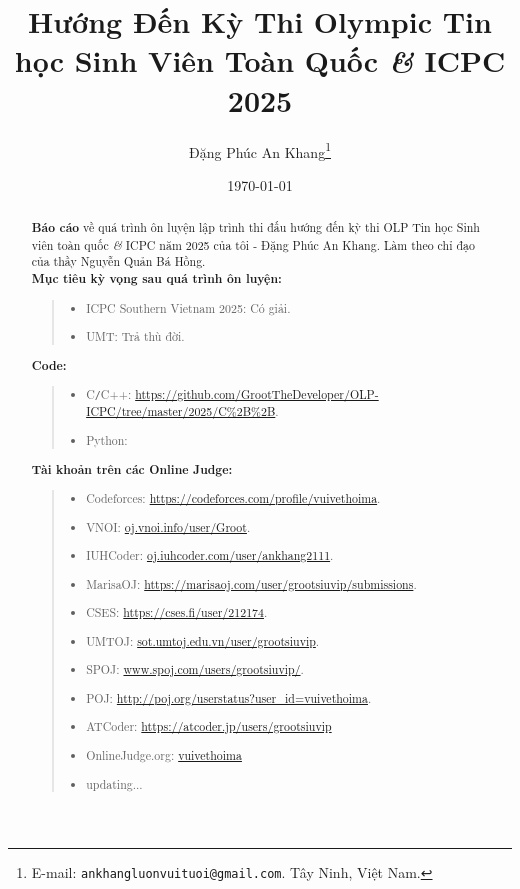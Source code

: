 \documentclass{article}
\title{Hướng Đến Kỳ Thi Olympic Tin học Sinh Viên Toàn Quốc {\it\&} ICPC 2025}
\author{Đặng Phúc An Khang\footnote{ E-mail: {\tt ankhangluonvuituoi@gmail.com}. Tây Ninh, Việt Nam.}}
\date{\today}
\begin{document}
\maketitle
\begin{abstract}
	\textbf{Báo cáo} về quá trình ôn luyện lập trình thi đấu hướng đến kỳ thi OLP Tin học Sinh viên toàn quốc {\it\&} ICPC năm 2025 của tôi - Đặng Phúc An Khang. Làm theo chỉ đạo của thầy Nguyễn Quản Bá Hồng.\\
	
	\textbf{Mục tiêu kỳ vọng sau quá trình ôn luyện:}
	\begin{quote}
	\begin{itemize}
		\item ICPC Southern Vietnam 2025: Có giải.
		\item UMT: Trả thù đời.\\ 
	\end{itemize}
	\end{quote}
	
	\textbf{Code:}
	\begin{quote}
		\begin{itemize}
			\item C{\tt/}C++: \url{https://github.com/GrootTheDeveloper/OLP-ICPC/tree/master/2025/C%2B%2B}.
			\item Python: \url{}\\
		\end{itemize}
	\end{quote}
	
	\textbf{Tài khoản trên các Online Judge:}
	\begin{quote}
    	\begin{itemize}
			\item Codeforces: \url{https://codeforces.com/profile/vuivethoima}.
			\item VNOI: \url{oj.vnoi.info/user/Groot}.
			\item IUHCoder: \url{oj.iuhcoder.com/user/ankhang2111}.
			\item MarisaOJ: \url{https://marisaoj.com/user/grootsiuvip/submissions}.
			\item CSES: \url{https://cses.fi/user/212174}.
			\item UMTOJ: \url{sot.umtoj.edu.vn/user/grootsiuvip}.
			\item SPOJ: \url{www.spoj.com/users/grootsiuvip/}.
			\item POJ: \url{http://poj.org/userstatus?user_id=vuivethoima}.
			\item ATCoder: \url{https://atcoder.jp/users/grootsiuvip}
			\item OnlineJudge.org: \url{vuivethoima}
			\item updating...
		\end{itemize}
	\end{quote}
    
\end{abstract}
\tableofcontents
\end{document}
